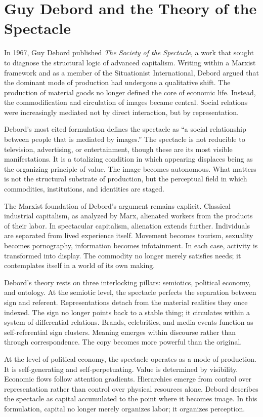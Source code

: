 \documentclass[11pt]{article}
\begin{document}
\section{Guy Debord and the Theory of the Spectacle}

In 1967, Guy Debord published \textit{The Society of the Spectacle}, a work that sought to diagnose the structural logic of advanced capitalism. Writing within a Marxist framework and as a member of the Situationist International, Debord argued that the dominant mode of production had undergone a qualitative shift. The production of material goods no longer defined the core of economic life. Instead, the commodification and circulation of images became central. Social relations were increasingly mediated not by direct interaction, but by representation.

Debord's most cited formulation defines the spectacle as ``a social relationship between people that is mediated by images.'' The spectacle is not reducible to television, advertising, or entertainment, though these are its most visible manifestations. It is a totalizing condition in which appearing displaces being as the organizing principle of value. The image becomes autonomous. What matters is not the structural substrate of production, but the perceptual field in which commodities, institutions, and identities are staged.

The Marxist foundation of Debord's argument remains explicit. Classical industrial capitalism, as analyzed by Marx, alienated workers from the products of their labor. In spectacular capitalism, alienation extends further. Individuals are separated from lived experience itself. Movement becomes tourism, sexuality becomes pornography, information becomes infotainment. In each case, activity is transformed into display. The commodity no longer merely satisfies needs; it contemplates itself in a world of its own making.

Debord's theory rests on three interlocking pillars: semiotics, political economy, and ontology. At the semiotic level, the spectacle perfects the separation between sign and referent. Representations detach from the material realities they once indexed. The sign no longer points back to a stable thing; it circulates within a system of differential relations. Brands, celebrities, and media events function as self-referential sign clusters. Meaning emerges within discourse rather than through correspondence. The copy becomes more powerful than the original.

At the level of political economy, the spectacle operates as a mode of production. It is self-generating and self-perpetuating. Value is determined by visibility. Economic flows follow attention gradients. Hierarchies emerge from control over representation rather than control over physical resources alone. Debord describes the spectacle as capital accumulated to the point where it becomes image. In this formulation, capital no longer merely organizes labor; it organizes perception.
\end{document}
